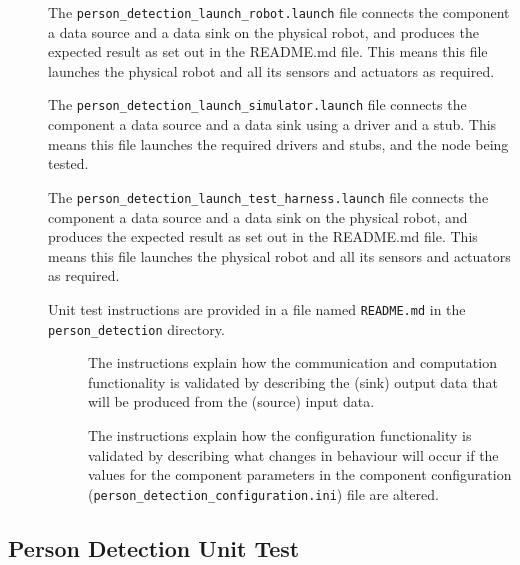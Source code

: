 \documentclass{CSSRforAfrica}
\newcommand{\checkboxChecked}{\fbox{\ding{51}}} %
\newcommand{\checkboxDashed}{\fbox{--}}         %
\begin{document}
\begin{description}
\item[\checkboxChecked] The {\small \verb+person_detection_launch_robot.launch+} file connects the component a data source and a data sink on the physical robot, and produces the expected result as set out in the README.md file. This means this file launches the physical robot and all its sensors and actuators as required.

\item[\checkboxDashed]   The {\small \verb+person_detection_launch_simulator.launch+} file connects the component a data source and a data sink using a driver and a stub. This means this file launches the required drivers and stubs, and the node being tested.

\item[\checkboxDashed]   The {\small \verb+person_detection_launch_test_harness.launch+} file connects the component a data source and a data sink on the physical robot, and produces the expected result as set out in the README.md file. This means this file launches the physical robot and all its sensors and actuators as required.

\item[\checkboxChecked] Unit test instructions are provided in a file named {\small \verb+README.md+} in the  {\small \verb+person_detection+} directory. 


\begin{description}

\item[\checkboxChecked] The instructions explain how the communication and computation functionality is validated by describing the (sink) output data that will be produced from the (source) input data.  

\item[\checkboxChecked] The instructions explain how the configuration functionality is validated by describing what changes in behaviour will occur if the values for the component parameters in the component configuration ({\small \verb+person_detection_configuration.ini+}) file are altered.

\end{description}

\end{description} 



\subsection{Person Detection Unit Test} 
\label{subsection:person_detetction_test}
\end{document}
